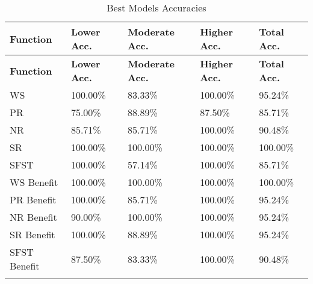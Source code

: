 \documentclass[12pt,letterpaper]{article}
\begin{document}
\begin{longtable}{|p{3cm}|p{3cm}|p{3cm}|p{3cm}|p{3cm}|}
\hline
\textbf{Function} & \textbf{Lower Acc.} & \textbf{Moderate Acc.} & \textbf{Higher Acc.} & \textbf{Total Acc.}  \\ \hline
\endfirsthead
\hline
\textbf{Function} & \textbf{Lower Acc.} & \textbf{Moderate Acc.} & \textbf{Higher Acc.} & \textbf{Total Acc.}  \\ \hline
\endhead

WS & 100.00\% & 83.33\% & 100.00\% & 95.24\% \\ \hline
PR & 75.00\% & 88.89\% & 87.50\% & 85.71\% \\ \hline
NR & 85.71\% & 85.71\% & 100.00\% & 90.48\% \\ \hline
SR & 100.00\% & 100.00\% & 100.00\% & 100.00\% \\ \hline
SFST & 100.00\% & 57.14\% & 100.00\% & 85.71\% \\ \hline

WS Benefit & 100.00\% & 100.00\% & 100.00\% & 100.00\% \\ \hline
PR Benefit & 100.00\% & 85.71\% & 100.00\% & 95.24\% \\ \hline
NR Benefit & 90.00\% & 100.00\% & 100.00\% & 95.24\% \\ \hline
SR Benefit & 100.00\% & 88.89\% & 100.00\% & 95.24\% \\ \hline
SFST Benefit & 87.50\% & 83.33\% & 100.00\% & 90.48\% \\ \hline

\caption{Best Models Accuracies}
\label{tab:grouping_1}
\end{longtable}
\end{document}
